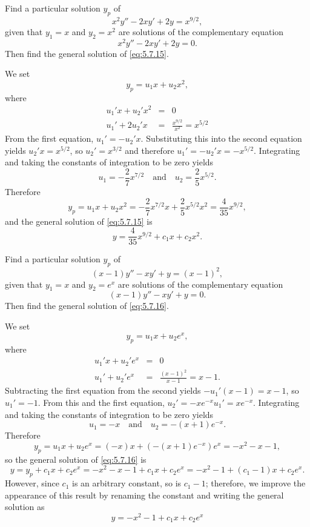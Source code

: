 \documentclass{ximera}
\begin{document}
\begin{example}\label{example:5.7.1}
 Find a particular
solution $y_p$ of
\begin{equation} \label{eq:5.7.15}
x^2y''-2xy'+2y=x^{9/2},
\end{equation}
given that $y_1=x$ and $y_2=x^2$ are solutions of the complementary
equation
$$
x^2y''-2xy'+2y=0.
$$
 Then find the general solution of \eqref{eq:5.7.15}.
 
 
\begin{explanation}
We set
$$
y_p=u_1x+u_2x^2,
$$
where
\begin{eqnarray*}
u_1'x+u_2'x^2&=&0\\
u_1'+2u_2'x&=&\frac{x^{9/2}}{x^2}=x^{5/2}
\end{eqnarray*}
From the first equation, $u_1'=-u_2'x$. Substituting this into the
second equation yields $u_2'x=x^{5/2}$, so $u_2'=x^{3/2}$ and
therefore $u_1'=-u_2'x=-x^{5/2}$. Integrating and taking the constants
of integration to be zero yields
$$
u_1=-\frac{2}{7}x^{7/2}\quad\mbox{and}\quad u_2=\frac{2}{5}x^{5/2}.
$$
Therefore
$$
y_p=u_1x+u_2x^2
=-\frac{2}{7}x^{7/2}x+\frac{2}{5}x^{5/2}x^2=\frac{4}{35}x^{9/2},
$$
and the general solution of  \eqref{eq:5.7.15} is
$$
y=\frac{4}{35}x^{9/2}+c_1x+c_2x^2.
$$
\end{explanation}
\end{example}
 
\begin{example}\label{example:5.7.2}
 Find a particular
solution $y_p$ of
\begin{equation} \label{eq:5.7.16}
(x-1)y''-xy'+y=(x-1)^2,
\end{equation}
given that $y_1=x$ and $y_2=e^x$ are solutions of the complementary
equation
$$
(x-1)y''-xy'+y=0.
$$
 Then find the general solution of \eqref{eq:5.7.16}.
 
\begin{explanation}
We set
$$
y_p=u_1x+u_2e^x,
$$
where
\begin{eqnarray*}
u_1'x+u_2'e^x&=&0\\
u_1'+u_2'e^x&=&\frac{(x-1)^2}{x-1}=x-1.
\end{eqnarray*}
Subtracting the first equation from the second yields
$-u_1'(x-1)=x-1$, so $u_1'=-1$. From this and the first equation,
$u_2'=-xe^{-x}u_1'=xe^{-x}$.
Integrating and taking the constants of integration to be zero yields
$$
u_1=-x  \quad\mbox{and}\quad u_2=-(x+1)e^{-x}.
$$
Therefore
$$
y_p=u_1x+u_2e^x
=(-x)x+(-(x+1)e^{-x})e^x=-x^2-x-1,
$$
so the general solution of \eqref{eq:5.7.16} is
\begin{equation} \label{eq:5.7.17}
y=y_p+c_1x+c_2e^x=-x^2-x-1+c_1x+c_2e^x = -x^2-1+(c_1-1)x+c_2e^x.
\end{equation}
However, since $c_1$ is an arbitrary constant, so is $c_1-1$;
therefore, we  improve the appearance of this result by
renaming the constant and writing the general solution as
\begin{equation} \label{eq:5.7.18}
y= -x^2-1+c_1x+c_2e^x
\end{equation}
\end{explanation}
\end{example}
 
\end{document}
